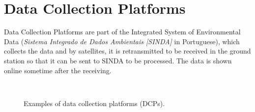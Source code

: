 \section{Data Collection Platforms}

Data Collection Platforms are part of the Integrated System of Environmental Data (\textit{Sistema Integrado de Dados Ambientais [SINDA]} in Portuguese), which collects the data and by satellites, it is retransmitted to be received in the ground station so that it can be sent to SINDA to be processed. The data is shown online sometime after the receiving. 
\cite{sinda}

\begin{figure}[!htb]
    \begin{center}
        ~

        \caption{Examples of data collection platforms (DCPs).}
        \label{fig:dcp-ex}
    \end{center}
\end{figure}
